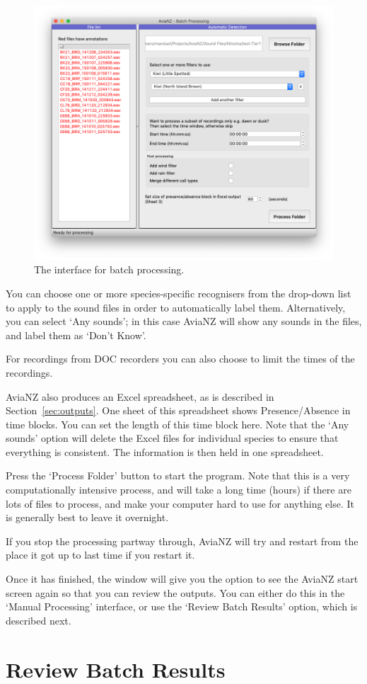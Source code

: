 \documentclass{article}
\begin{document}
\begin{figure}[h!]
\centering
\includegraphics[width=.5\textwidth]{Figs/Batch1}
\caption{The interface for batch processing.}
\label{batch}
\end{figure}

You can choose one or more species-specific recognisers from the drop-down list to apply to the sound files in order to automatically label them. Alternatively, you can select `Any sounds'; in this case AviaNZ will show any sounds in the files, and label them as `Don't Know'. 

For recordings from DOC recorders you can also choose to limit the times of the recordings. 

AviaNZ also produces an Excel spreadsheet, as is described in Section~\ref{sec:outputs}. One sheet of this spreadsheet shows Presence/Absence in time blocks. You can set the length of this time block here.
Note that the `Any sounds' option will delete the Excel files for individual species to ensure that everything is consistent. The information is then held in one spreadsheet.  

Press the `Process Folder' button to start the program. Note that this is a very computationally intensive process, and will take a long time (hours) if there are lots of files to process, and make your computer hard to use for anything else. It is generally best to leave it overnight.

If you stop the processing partway through, AviaNZ will try and restart from the place it got up to last time if you restart it.

Once it has finished, the window will give you the option to see the AviaNZ start screen again so that you can review the outputs. You can either do this in the `Manual Processing' interface, or use the `Review Batch Results' option, which is described next. 

\section{Review Batch Results}\label{sec:review}
\end{document}
